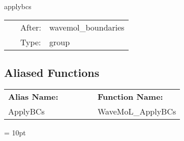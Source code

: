 \vspace{5mm}


\hspace{5mm} applybcs 

\hspace{5mm}{\it apply boundary conditions for wavemol } 


\hspace{5mm}

 \begin{tabular*}{160mm}{cll} 
~ & After:  & wavemol\_boundaries \\ 
~ & Type:  & group \\ 
\end{tabular*} 


\subsection*{Aliased Functions}

\hspace{5mm}

 \begin{tabular*}{160mm}{ll} 

{\bf Alias Name:} ~~~~~~~ & {\bf Function Name:} \\ 
ApplyBCs & WaveMoL\_ApplyBCs \\ 
\end{tabular*} 



\vspace{5mm}\parskip = 10pt 

